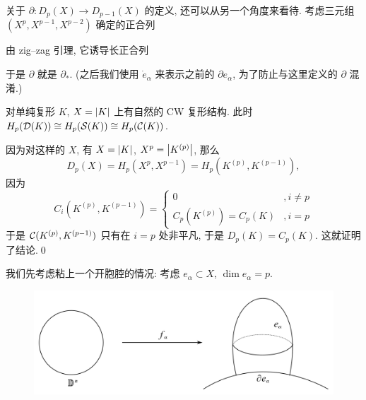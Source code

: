 关于 $ \partial : D_p(X)\to D_{p-1}(X) $ 的定义, 还可以从另一个角度来看待. 考虑三元组 $ (X^p,X^{p-1},X^{p-2}) $ 确定的正合列
\begin{center}
\end{center}
由 zig--zag 引理, 它诱导长正合列
\begin{center}
\end{center}
于是 $ \partial $ 就是 $ \partial_* $. (之后我们使用 $ \dot{e}_\alpha $ 来表示之前的 $ \partial e_\alpha $, 为了防止与这里定义的 $ \partial $ 混淆.)

\begin{Proposition}
	对单纯复形 $ K $, $ X=\left| K \right|  $ 上有自然的 CW 复形结构. 此时 $ H_p(\mathcal{D}(K))\cong H_p(\mathcal{S}(K))\cong H_p(\mathcal{C}(K)) $.
\end{Proposition}
\begin{Proof}
	因为对这样的 $ X $, 有 $ X=\left| K \right|  $, $ X^p=\left| K^{(p)} \right|  $, 那么
	\[
		D_p(X)=H_p(X^p,X^{p-1})=H_p(K^{(p)},K^{(p-1)}),
	\]
	因为
	\[
		C_i(K^{(p)},K^{(p-1)})=\begin{cases}
			0 & ,i\ne p \\ C_p(K^{(p)})=C_p(K) & ,i=p
		\end{cases}
	\]
	于是 $ \mathcal{C}(K^{(p)},K^{(p-1)}) $ 只有在 $ i=p $ 处非平凡, 于是 $ D_p(K)=C_p(K) $. 这就证明了结论.\qed
\end{Proof}

我们先考虑粘上一个开胞腔的情况: 考虑 $ e_\alpha\subset X $, $ \dim e_\alpha=p $.
\begin{figure}[htbp]
	\centering
	\includegraphics[width=0.5\linewidth]{figures/Sec13-1.png}
\end{figure}

